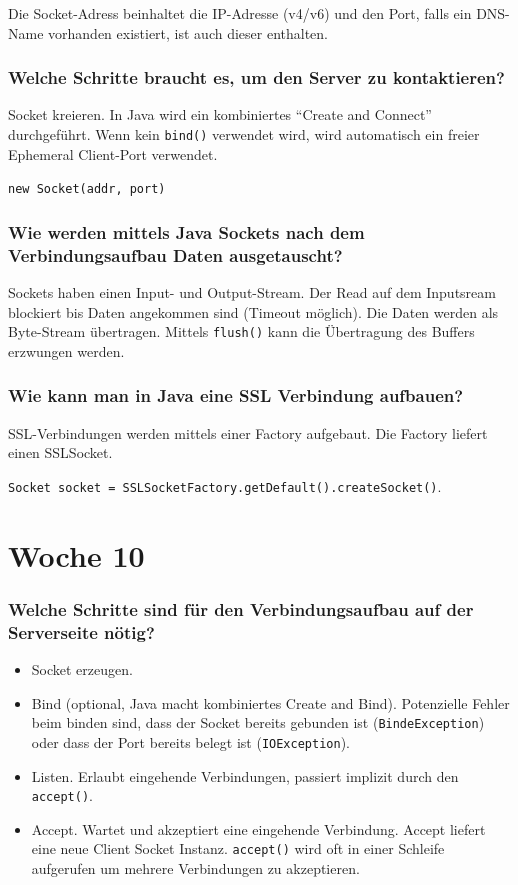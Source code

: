 \documentclass[10pt,a4paper]{scrartcl}
\begin{document}
Die Socket-Adress beinhaltet die IP-Adresse (v4/v6) und den Port, falls ein DNS-Name vorhanden
existiert, ist auch dieser enthalten.
 
\subsubsection{Welche Schritte braucht es, um den Server zu kontaktieren?}

Socket kreieren. In Java wird ein kombiniertes "`Create
and Connect"' durchgeführt. Wenn kein \texttt{bind()} verwendet wird, wird automatisch ein freier
Ephemeral Client-Port verwendet.

\texttt{new Socket(\dq addr\dq, port)}
 
\subsubsection{Wie werden mittels Java Sockets nach dem Verbindungsaufbau Daten ausgetauscht?}

Sockets haben einen Input- und Output-Stream. Der Read auf dem Inputsream blockiert bis Daten
angekommen sind (Timeout möglich). Die Daten werden als Byte-Stream übertragen. Mittels
\texttt{flush()} kann die Übertragung des Buffers erzwungen werden.
 
\subsubsection{Wie kann man in Java eine SSL Verbindung aufbauen? }

SSL-Verbindungen werden mittels einer Factory aufgebaut. Die Factory liefert einen SSLSocket.

\texttt{Socket socket = SSLSocketFactory.getDefault().createSocket()}.


\section{Woche 10}

\subsubsection{Welche Schritte sind für den Verbindungsaufbau auf der Serverseite nötig?}

\begin{itemize}
	\item Socket erzeugen.
	\item Bind (optional, Java macht kombiniertes Create and Bind). Potenzielle Fehler beim
		binden sind, dass der Socket bereits gebunden ist (\texttt{BindeException}) oder dass der Port
		bereits belegt ist (\texttt{IOException}).
	\item Listen. Erlaubt eingehende Verbindungen, passiert implizit durch den \texttt{accept()}.
	\item Accept. Wartet und akzeptiert eine eingehende Verbindung. Accept liefert eine neue Client
		Socket Instanz. \texttt{accept()} wird oft in einer Schleife aufgerufen um mehrere Verbindungen
		zu akzeptieren.
\end{itemize}
\end{document}
